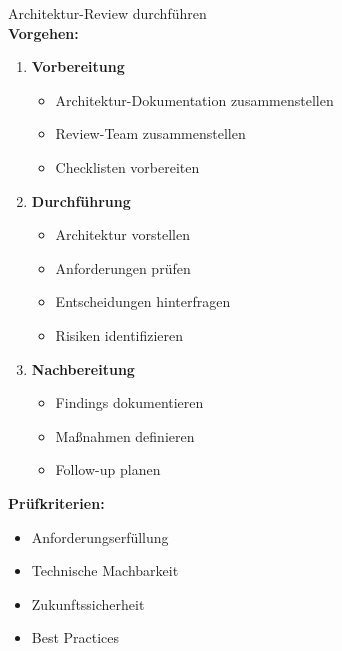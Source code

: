 \begin{KR}{Architektur-Review durchführen}\\
\textbf{Vorgehen:}
\begin{enumerate}
    \item \textbf{Vorbereitung}
    \begin{itemize}
        \item Architektur-Dokumentation zusammenstellen
        \item Review-Team zusammenstellen
        \item Checklisten vorbereiten
    \end{itemize}
    
    \item \textbf{Durchführung}
    \begin{itemize}
        \item Architektur vorstellen
        \item Anforderungen prüfen
        \item Entscheidungen hinterfragen
        \item Risiken identifizieren
    \end{itemize}
    
    \item \textbf{Nachbereitung}
    \begin{itemize}
        \item Findings dokumentieren
        \item Maßnahmen definieren
        \item Follow-up planen
    \end{itemize}
\end{enumerate}

\textbf{Prüfkriterien:}
\begin{itemize}
    \item Anforderungserfüllung
    \item Technische Machbarkeit
    \item Zukunftssicherheit
    \item Best Practices
\end{itemize}
\end{KR}

